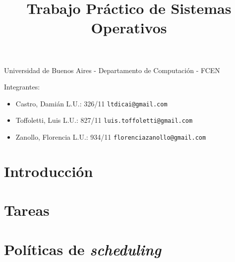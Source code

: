 \documentclass[a4paper,11pt]{article}
\title{Trabajo Práctico de Sistemas Operativos}
\begin{document}
\maketitle

\begin{center}
	Universidad de Buenos Aires - Departamento de Computaci\'on - FCEN
\end{center}

\vspace{2cm}
Integrantes:

\begin{itemize}
	\item Castro, Dami\'an L.U.: 326/11  \verb+ltdicai@gmail.com+
	\item Toffoletti, Luis L.U.: 827/11 \verb+luis.toffoletti@gmail.com+
	\item Zanollo, Florencia L.U.: 934/11 \verb+florenciazanollo@gmail.com+
\end{itemize}

\newpage

\tableofcontents

\newpage

\section{Introducción}


\section{Tareas}





\newpage





\newpage



\newpage

\section{Pol\'iticas de \emph{scheduling}}


\newpage 



\newpage







\end{document}
